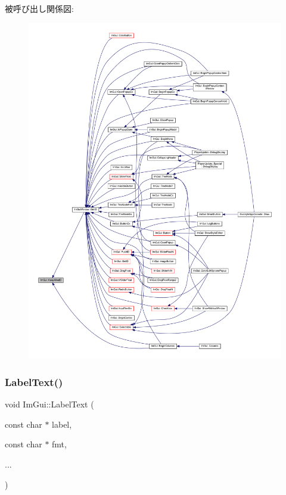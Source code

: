 被呼び出し関係図\+:\nopagebreak
\begin{figure}[H]
\begin{center}
\leavevmode
\includegraphics[width=350pt]{namespace_im_gui_a85a245c78a9f7c351636bdad6e60c488_icgraph}
\end{center}
\end{figure}
\mbox{\label{namespace_im_gui_ad92ccfbc33d448ff40cfcf9219177344}} 
\subsubsection{\texorpdfstring{Label\+Text()}{LabelText()}}
{\footnotesize\ttfamily void Im\+Gui\+::\+Label\+Text (\begin{DoxyParamCaption}\item[{const char $\ast$}]{label,  }\item[{const char $\ast$}]{fmt,  }\item[{}]{... }\end{DoxyParamCaption})}




